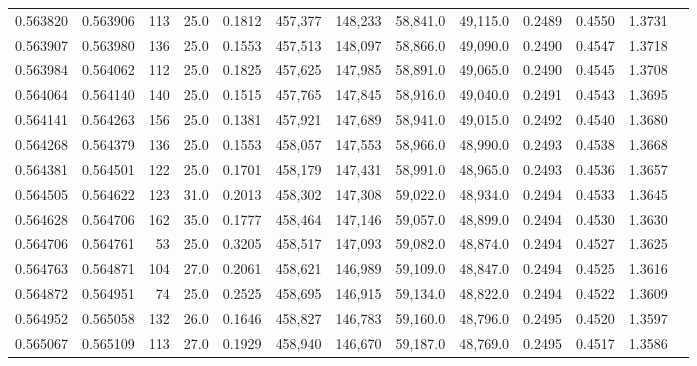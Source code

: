 \begin{tabular}{rrrrrrrrrrrrr}
0.563820 & 0.563906 &   113 & 25.0 &                                     0.1812 & 457,377 & 148,233 &  58,841.0 &  49,115.0 & 0.2489 & 0.4550 & 1.3731 \\
0.563907 & 0.563980 &   136 & 25.0 &                                     0.1553 & 457,513 & 148,097 &  58,866.0 &  49,090.0 & 0.2490 & 0.4547 & 1.3718 \\
0.563984 & 0.564062 &   112 & 25.0 &                                     0.1825 & 457,625 & 147,985 &  58,891.0 &  49,065.0 & 0.2490 & 0.4545 & 1.3708 \\
0.564064 & 0.564140 &   140 & 25.0 &                                     0.1515 & 457,765 & 147,845 &  58,916.0 &  49,040.0 & 0.2491 & 0.4543 & 1.3695 \\
0.564141 & 0.564263 &   156 & 25.0 &                                     0.1381 & 457,921 & 147,689 &  58,941.0 &  49,015.0 & 0.2492 & 0.4540 & 1.3680 \\
0.564268 & 0.564379 &   136 & 25.0 &                                     0.1553 & 458,057 & 147,553 &  58,966.0 &  48,990.0 & 0.2493 & 0.4538 & 1.3668 \\
0.564381 & 0.564501 &   122 & 25.0 &                                     0.1701 & 458,179 & 147,431 &  58,991.0 &  48,965.0 & 0.2493 & 0.4536 & 1.3657 \\
0.564505 & 0.564622 &   123 & 31.0 &                                     0.2013 & 458,302 & 147,308 &  59,022.0 &  48,934.0 & 0.2494 & 0.4533 & 1.3645 \\
0.564628 & 0.564706 &   162 & 35.0 &                                     0.1777 & 458,464 & 147,146 &  59,057.0 &  48,899.0 & 0.2494 & 0.4530 & 1.3630 \\
0.564706 & 0.564761 &    53 & 25.0 &                                     0.3205 & 458,517 & 147,093 &  59,082.0 &  48,874.0 & 0.2494 & 0.4527 & 1.3625 \\
0.564763 & 0.564871 &   104 & 27.0 &                                     0.2061 & 458,621 & 146,989 &  59,109.0 &  48,847.0 & 0.2494 & 0.4525 & 1.3616 \\
0.564872 & 0.564951 &    74 & 25.0 &                                     0.2525 & 458,695 & 146,915 &  59,134.0 &  48,822.0 & 0.2494 & 0.4522 & 1.3609 \\
0.564952 & 0.565058 &   132 & 26.0 &                                     0.1646 & 458,827 & 146,783 &  59,160.0 &  48,796.0 & 0.2495 & 0.4520 & 1.3597 \\
0.565067 & 0.565109 &   113 & 27.0 &                                     0.1929 & 458,940 & 146,670 &  59,187.0 &  48,769.0 & 0.2495 & 0.4517 & 1.3586 \\

\end{tabular}
